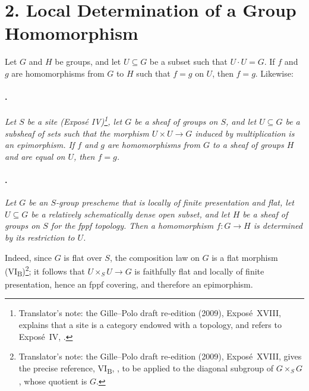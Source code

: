 \section*{2. Local Determination of a
Group Homomorphism}

Let \(G\) and \(H\) be groups, and let \(U\subseteq G\) be a subset
such that \(U\cdot U=G\). If \(f\) and \(g\) are homomorphisms from
\(G\) to \(H\) such that \(f=g\) on \(U\), then \(f=g\). Likewise:

\paragraph{.}
\textit{Let \(S\) be a site (Exposé IV)\footnote{Translator's note: the Gille--Polo draft re-edition (2009),
Exposé~XVIII, explains that a site is a category endowed with a topology, and refers to
Exposé~IV, .},
let \(G\) be a sheaf of groups on \(S\), and let \(U\subseteq G\) be
a subsheaf of sets such that the morphism \(U\times U\to G\)
induced by multiplication is an epimorphism. If \(f\) and \(g\) are
homomorphisms from \(G\) to a sheaf of groups \(H\) and are equal on
\(U\), then \(f=g\).}

\paragraph{.}
\textit{Let \(G\) be an \(S\)-group prescheme that is locally of
finite presentation and flat, let \(U\subseteq G\) be a relatively
schematically dense open subset, and let \(H\) be a sheaf of groups
on \(S\) for the fppf topology. Then a homomorphism
\(f:G\to H\) is determined by its restriction to \(U\).}

Indeed, since \(G\) is flat over \(S\), the composition law on \(G\)
is a flat morphism (VI\textsubscript{B})\footnote{Translator's note: the Gille--Polo draft
re-edition (2009), Exposé~XVIII, gives the precise reference, VI\textsubscript{B},
, to be applied to the diagonal subgroup of
\(G\times_S G\), whose quotient is \(G\).}; it follows that
\(U\times_S U\to G\) is faithfully flat and locally of finite
presentation, hence an fppf covering, and therefore an epimorphism.

